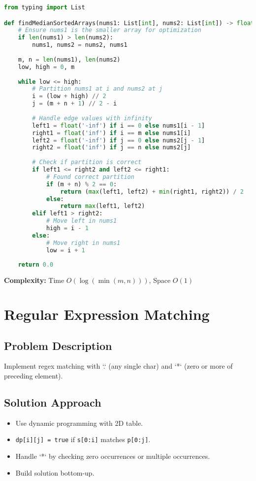 \documentclass[10pt, a4paper]{article}
\begin{document}
\begin{lstlisting}[language=Python]
from typing import List

def findMedianSortedArrays(nums1: List[int], nums2: List[int]) -> float:
    # Ensure nums1 is the smaller array for optimization
    if len(nums1) > len(nums2):
        nums1, nums2 = nums2, nums1
    
    m, n = len(nums1), len(nums2)
    low, high = 0, m
    
    while low <= high:
        # Partition nums1 at i and nums2 at j
        i = (low + high) // 2
        j = (m + n + 1) // 2 - i
        
        # Handle edge values with infinity
        left1 = float('-inf') if i == 0 else nums1[i - 1]
        right1 = float('inf') if i == m else nums1[i]
        left2 = float('-inf') if j == 0 else nums2[j - 1]
        right2 = float('inf') if j == n else nums2[j]
        
        # Check if partition is correct
        if left1 <= right2 and left2 <= right1:
            # Found correct partition
            if (m + n) % 2 == 0:
                return (max(left1, left2) + min(right1, right2)) / 2
            else:
                return max(left1, left2)
        elif left1 > right2:
            # Move left in nums1
            high = i - 1
        else:
            # Move right in nums1
            low = i + 1
    
    return 0.0
\end{lstlisting}
\textbf{Complexity:} Time $O(\log(\min(m,n)))$, Space $O(1)$

\section{Regular Expression Matching}
\subsection*{Problem Description}
Implement regex matching with `.` (any single char) and `*` (zero or more of preceding element).

\subsection*{Solution Approach}
\begin{itemize}
    \item Use dynamic programming with 2D table.
    \item \texttt{dp[i][j] = true} if \texttt{s[0:i]} matches \texttt{p[0:j]}.
    \item Handle `*` by checking zero occurrences or multiple occurrences.
    \item Build solution bottom-up.
\end{itemize}
\end{document}
